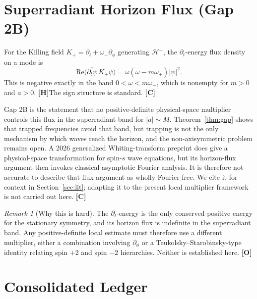 \documentclass[11pt,a4paper]{article}
\newcommand{\VH}{\textcolor{vh}{\textbf{[H]}}}
\newcommand{\CC}{\textcolor{cc}{\textbf{[C]}}}
\newcommand{\OO}{\textcolor{oo}{\textbf{[O]}}}
\theoremstyle{remark}
\newtheorem{remark}[theorem]{Remark}
\theoremstyle{definition}
\begin{document}
\section{Superradiant Horizon Flux (Gap 2B)}
\label{sec:gap2b}

For the Killing field $K_+ = \partial_t + \omega_+\partial_\phi$ generating $\mathcal{H}^+$, the $\partial_t$-energy flux density on a mode is
\[
\mathrm{Re}\bigl(\overline{\partial_t\psi}\,K_+\psi\bigr) = \omega(\omega - m\omega_+)|\psi|^2.
\]
This is negative exactly in the band $0 < \omega < m\omega_+$, which is nonempty for $m>0$ and $a>0$. \VH The sign structure is standard. \CC

Gap 2B is the statement that no positive-definite physical-space multiplier controls this flux in the superradiant band for $|a|\sim M$. Theorem~\ref{thm:gap} shows that trapped frequencies avoid that band, but trapping is not the only mechanism by which waves reach the horizon, and the non-axisymmetric problem remains open. A 2026 generalized Whiting-transform preprint does give a physical-space transformation for spin-$s$ wave equations, but its horizon-flux argument then invokes classical asymptotic Fourier analysis. It is therefore not accurate to describe that flux argument as wholly Fourier-free. We cite it for context in Section~\ref{sec:lit}; adapting it to the present local multiplier framework is not carried out here. \CC

\begin{remark}[Why this is hard]
The $\partial_t$-energy is the only conserved positive energy for the stationary symmetry, and its horizon flux is indefinite in the superradiant band. Any positive-definite local estimate must therefore use a different multiplier, either a combination involving $\partial_\phi$ or a Teukolsky--Starobinsky-type identity relating spin $+2$ and spin $-2$ hierarchies. Neither is established here. \OO
\end{remark}

\section{Consolidated Ledger}
\label{sec:ledger}
\end{document}
